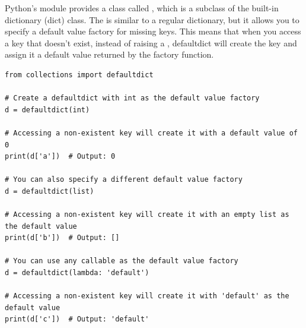 Python's  module provides a class called , which is a subclass of the built-in dictionary (dict) class. The  is similar to a regular dictionary, but it allows you to specify a default value factory for missing keys. This means that when you access a key that doesn't exist, instead of raising a , defaultdict will create the key and assign it a default value returned by the factory function.
\begin{lstlisting}
from collections import defaultdict

# Create a defaultdict with int as the default value factory
d = defaultdict(int)

# Accessing a non-existent key will create it with a default value of 0
print(d['a'])  # Output: 0

# You can also specify a different default value factory
d = defaultdict(list)

# Accessing a non-existent key will create it with an empty list as the default value
print(d['b'])  # Output: []

# You can use any callable as the default value factory
d = defaultdict(lambda: 'default')

# Accessing a non-existent key will create it with 'default' as the default value
print(d['c'])  # Output: 'default'
\end{lstlisting}









\subsubsection{}

